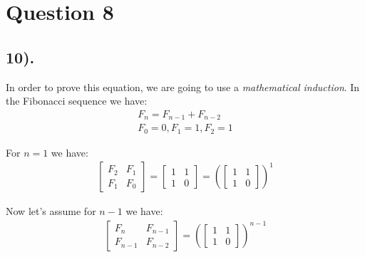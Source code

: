 \documentclass[12pt]{article}
\begin{document}
\section*{Question 8}
\subsection*{10).}
In order to prove this equation, we are going to use a \textit{mathematical induction}. In the Fibonacci sequence we have:
\begin{gather*}
    F_{n} = F_{n-1} + F_{n-2} \\
    F_{0}=0, F_{1}=1, F_{2}=1
\end{gather*}

For $n=1$ we have:
\begin{gather*}
    \begin{bmatrix}
        F_{2} & F_{1} \\
        F_{1} & F_{0}
    \end{bmatrix}
    =
    \begin{bmatrix}
        1 & 1 \\
        1 & 0
    \end{bmatrix}
    =
    \left(\begin{bmatrix}
        1 & 1 \\
        1 & 0
    \end{bmatrix}\right)^1
\end{gather*}

Now let's assume for $n-1$ we have:
\begin{gather*}
    \begin{bmatrix}
        F_{n} & F_{n-1} \\
        F_{n-1} & F_{n-2}
    \end{bmatrix}
    =
    \left(\begin{bmatrix}
    1 & 1 \\
    1 & 0
    \end{bmatrix}\right)^{n-1}
\end{gather*}
\end{document}
